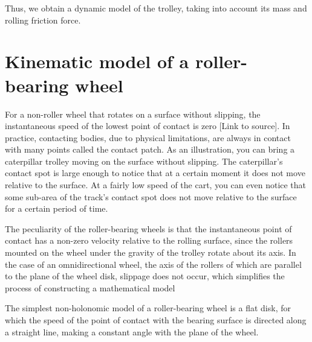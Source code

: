 \documentclass[oneside,final,14pt]{extreport}
\begin{document}
Thus, we obtain a dynamic model of the trolley, taking into account its mass and rolling friction force.

\iffalse
In ref, the dynamic model of a trolley with N roller-bearing wheels is considered in more detail. The trolley model is built on the assumption that the roller-bearing wheel model is a solid disk, the speed of the lowest point of which is perpendicular to the direction of the roller axis at this point. In addition, the controllability criterion of such a model is considered, from which a number of restrictions on its design follow. For example, if the sum of the angle of the axis of the roller and the angle of rotation of the wheel of all roller-bearing wheels is equal, then such a model cannot move along an arbitrary trajectory. If these angles of the two wheels coincide, then a pair of wheels can be taken as one virtual wheel with the radius vector $ r_{ij} = r_{i} - r_{j} $ in the local coordinate system and the moment $ T_{ij} = T_{i} + T_{j} $.
\fi
\chapter{Kinematic model of a roller-bearing wheel}
For a non-roller wheel that rotates on a surface without slipping, the instantaneous speed of the lowest point of contact is zero [Link to source]. In practice, contacting bodies, due to physical limitations, are always in contact with many points called the contact patch. As an illustration, you can bring a caterpillar trolley moving on the surface without slipping. The caterpillar’s ​​contact spot is large enough to notice that at a certain moment it does not move relative to the surface. At a fairly low speed of the cart, you can even notice that some sub-area of ​​the track’s contact spot does not move relative to the surface for a certain period of time.

The peculiarity of the roller-bearing wheels is that the instantaneous point of contact has a non-zero velocity relative to the rolling surface, since the rollers mounted on the wheel under the gravity of the trolley rotate about its axis. In the case of an omnidirectional wheel, the axis of the rollers of which are parallel to the plane of the wheel disk, slippage does not occur, which simplifies the process of constructing a mathematical model

 The simplest non-holonomic model of a roller-bearing wheel is a flat disk, for which the speed of the point of contact with the bearing surface is directed along a straight line, making a constant angle with the plane of the wheel.
 
\end{document}
